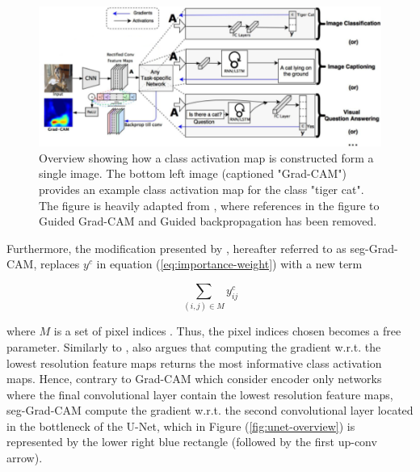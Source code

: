 \documentclass[../main/thesis.tex]{subfiles}
\begin{document}
\begin{figure}
    \centering
    \includegraphics[width=\textwidth]{GradCAM}
    \caption{\label{fig:gradcam}Overview showing how a class activation map is constructed form a single image. The bottom left image (captioned "Grad-CAM") provides an example class activation map for the class "tiger cat". The figure is heavily adapted from \protect\citep{Selvaraju2016}, where references in the figure to Guided Grad-CAM and Guided backpropagation has been removed.}
\end{figure}

Furthermore, the modification presented by \citet{Vinogradova2020}, hereafter referred to as seg-Grad-CAM, replaces $y^c$ in equation (\ref{eq:importance-weight}) with a new term 

\begin{equation}
    \sum_{(i,j) \in M} y_{ij}^c
\end{equation}

where $M$ is a set of pixel indices \citep{Vinogradova2020}. Thus, the pixel indices chosen becomes a free parameter. Similarly to \citep{Selvaraju2016}, \citet{Vinogradova2020} also argues that computing the gradient w.r.t. the lowest resolution feature maps returns the most informative class activation maps. Hence, contrary to Grad-CAM which consider encoder only networks where the final convolutional layer contain the lowest resolution feature maps, seg-Grad-CAM compute the gradient w.r.t. the second convolutional layer located in the bottleneck of the U-Net, which in Figure (\ref{fig:unet-overview}) is represented by the lower right blue rectangle (followed by the first up-conv arrow).

\biblio
\end{document}
